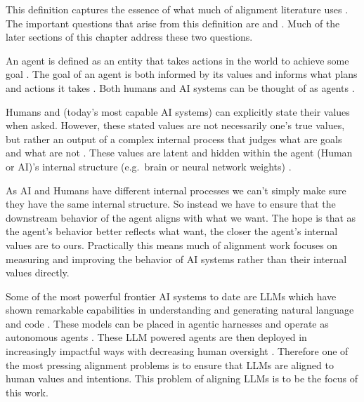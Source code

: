 This definition captures the essence of what much of alignment literature uses \cite{christianoClarifyingAIAlignment2018,jiAIAlignmentComprehensive2025,leikeScalableAgentAlignment2018}. The important questions that arise from this definition are  and . Much of the later sections of this chapter address these two questions.

An agent is defined as an entity that takes actions in the world to achieve some goal \cite{suttonReinforcementLearningSecond2018a}. The goal of an agent is both informed by its values and informs what plans and actions it takes \cite{bratmanIntentionPlansPractical1987}. Both humans and AI systems can be thought of as agents \cite{dennettIntentionalStance1989,russellArtificialIntelligenceGlobal2021}.

Humans and  (today's most capable AI systems) can explicitly state their values when asked. However, these stated values are not necessarily one's true values, but rather an output of a complex internal process that judges what are  goals and what are not \cite{nisbettTellingMoreWe1977}. These values are latent and hidden within the agent (Human or AI)'s internal structure (e.g.\ brain or neural network weights) \cite{burnsDiscoveringLatentKnowledge2024,rokeachNatureHumanValues1973}. 

As AI and Humans have different internal processes we can't simply make sure they have the same internal structure. So instead we have to ensure that the downstream behavior of the agent aligns with what we want. The hope is that as the agent's behavior better reflects what  want, the closer the agent's internal values are to ours. Practically this means much of alignment work focuses on measuring and improving the behavior of AI systems rather than their internal values directly.

Some of the most powerful frontier AI systems to date are LLMs which have shown remarkable capabilities in understanding and generating natural language and code \cite{team2023gemini,chenEvaluatingLargeLanguage2021,minaeeLargeLanguageModels2025, zhaoSurveyLargeLanguage2025}. These models can be placed in agentic harnesses and operate as autonomous agents \cite{yaoReActSynergizingReasoning2023a,schickToolformerLanguageModels2023}. These LLM powered agents are then deployed in increasingly impactful ways with decreasing human oversight \cite{bengioSuperintelligentAgentsPose2025a,chanHarmsIncreasinglyAgentic2023}. Therefore one of the most pressing alignment problems is to ensure that LLMs are aligned to human values and intentions. This problem of aligning LLMs is to be the focus of this work.


